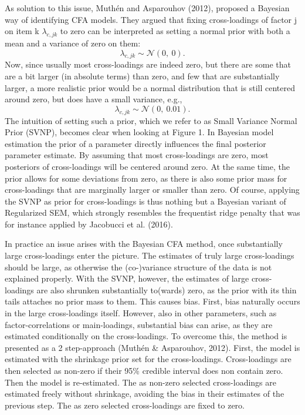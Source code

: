 \documentclass[
  man, donotrepeattitle,floatsintext]{apa6}
\begin{document}
As solution to this issue, Muthén and Asparouhov (2012), proposed a Bayesian way of identifying CFA models. They argued that fixing cross-loadings of factor j on item k \(\lambda_{c,jk}\) to zero can be interpreted as setting a normal prior with both a mean and a variance of zero on them:
\[\lambda_{c,jk}  \sim \mathcal{N}(0, \ 0).\]
Now, since usually most cross-loadings are indeed zero, but there are some that are a bit larger (in absolute terms) than zero, and few that are substantially larger, a more realistic prior would be a normal distribution that is still centered around zero, but does have a small variance, e.g.,\\
\[\lambda_{c,jk}  \sim \mathcal{N}(0, \ 0.01).\]
The intuition of setting such a prior, which we refer to as Small Variance Normal Prior (SVNP), becomes clear when looking at Figure 1. In Bayesian model estimation the prior of a parameter directly influences the final posterior parameter estimate. By assuming that most cross-loadings are zero, most posteriors of cross-loadings will be centered around zero. At the same time, the prior allows for some deviations from zero, as there is also some prior mass for cross-loadings that are marginally larger or smaller than zero. Of course, applying the SVNP as prior for cross-loadings is thus nothing but a Bayesian variant of Regularized SEM, which strongly resembles the frequentist ridge penalty that was for instance applied by Jacobucci et al. (2016).

In practice an issue arises with the Bayesian CFA method, once substantially large cross-loadings enter the picture. The estimates of truly large cross-loadings should be large, as otherwise the (co-)variance structure of the data is not explained properly. With the SVNP, however, the estimates of large cross-loadings are also shrunken substantially to(wards) zero, as the prior with its thin tails attaches no prior mass to them. This causes bias. First, bias naturally occurs in the large cross-loadings itself. However, also in other parameters, such as factor-correlations or main-loadings, substantial bias can arise, as they are estimated conditionally on the cross-loadings. To overcome this, the method is presented as a 2 step-approach (Muthén \& Asparouhov, 2012). First, the model is estimated with the shrinkage prior set for the cross-loadings. Cross-loadings are then selected as non-zero if their 95\% credible interval does non contain zero. Then the model is re-estimated. The as non-zero selected cross-loadings are estimated freely without shrinkage, avoiding the bias in their estimates of the previous step. The as zero selected cross-loadings are fixed to zero.
\end{document}
